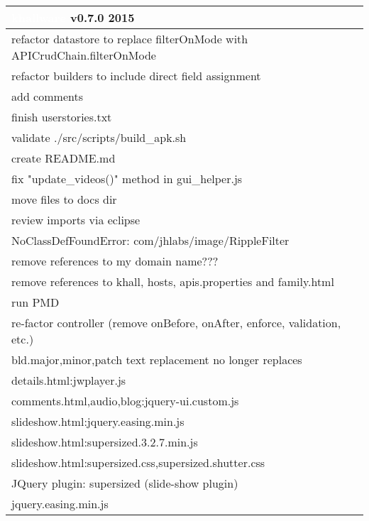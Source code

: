 \documentclass[notitlepage]{article}
\newcommand{\releasedate}{2015}
\begin{document}
\begin{center}
\begin{tabular}{ | l | }
\hline
\LARGE\cellcolor{myblue}\textcolor{white}{khallware} v0.7.0 \releasedate{} \\
\hline
refactor datastore to replace filterOnMode with APICrudChain.filterOnMode \\
\hline
refactor builders to include direct field assignment \\
\hline
add comments \\
\hline
finish userstories.txt \\
\hline
validate ./src/scripts/build\_apk.sh \\
\hline
create README.md \\
\hline
fix "update\_videos()" method in gui\_helper.js \\
\hline
move files to docs dir \\
\hline
review imports via eclipse \\
\hline
NoClassDefFoundError: com/jhlabs/image/RippleFilter \\
\hline
remove references to my domain name??? \\
\hline
remove references to khall, hosts, apis.properties and family.html \\
\hline
run PMD \\
\hline
re-factor controller (remove onBefore, onAfter, enforce, validation, etc.) \\
\hline
bld.major,minor,patch text replacement no longer replaces \\
\hline
details.html:jwplayer.js \\
\hline
comments.html,audio,blog:jquery-ui.custom.js \\
\hline
slideshow.html:jquery.easing.min.js \\
\hline
slideshow.html:supersized.3.2.7.min.js \\
\hline
slideshow.html:supersized.css,supersized.shutter.css \\
\hline
JQuery plugin: supersized (slide-show plugin) \\
\hline
jquery.easing.min.js \\
\hline

\end{tabular}
\end{center}
\end{document}
